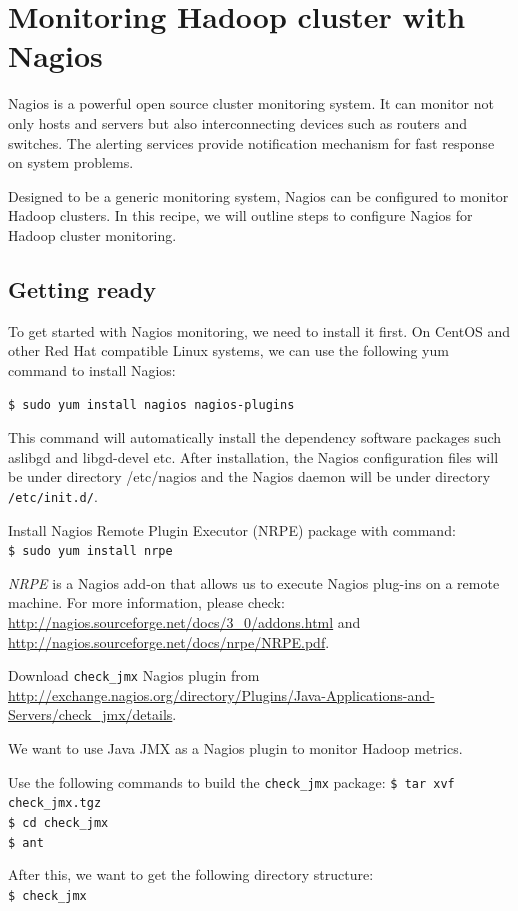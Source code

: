 \section{Monitoring Hadoop cluster with Nagios}
Nagios is a powerful open source cluster monitoring system. It can monitor not only hosts and servers but also interconnecting devices such as routers and switches. The alerting services provide notification mechanism for fast response on system problems.

Designed to be a generic monitoring system, Nagios can be configured to monitor Hadoop clusters. In this recipe, we will outline steps to configure Nagios for Hadoop cluster monitoring.
\subsection*{Getting ready}
To get started with Nagios monitoring, we need to install it first. On CentOS and other Red Hat compatible Linux systems, we can use the following yum command to install Nagios:

\verb|$ sudo yum install nagios nagios-plugins|

This command will automatically install the dependency software packages such aslibgd and libgd-devel etc. After installation, the Nagios configuration files will be under directory /etc/nagios and the Nagios daemon will be under directory \verb|/etc/init.d/|.

Install Nagios Remote Plugin Executor (NRPE) package with command:\\
\verb|$ sudo yum install nrpe|

\emph{NRPE} is a Nagios add-on that allows us to execute Nagios plug-ins on a remote machine. For more information, please check: \url{http://nagios.sourceforge.net/docs/3_0/addons.html} and \url{http://nagios.sourceforge.net/docs/nrpe/NRPE.pdf}.

Download \verb|check_jmx| Nagios plugin from \url{http://exchange.nagios.org/directory/Plugins/Java-Applications-and-Servers/check_jmx/details}.

We want to use Java JMX as a Nagios plugin to monitor Hadoop metrics.

Use the following commands to build the \verb|check_jmx| package:
\verb|$ tar xvf check_jmx.tgz| \\
\verb|$ cd check_jmx| \\
\verb|$ ant|

After this, we want to get the following directory structure:\\
\verb|$ check_jmx| \\

